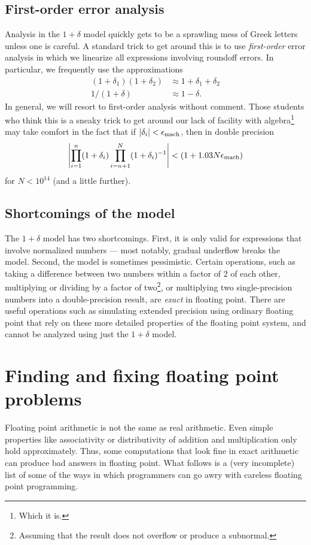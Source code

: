 \documentclass[12pt, leqno]{article} %
\begin{document}
\subsection{First-order error analysis}

Analysis in the $1+\delta$ model quickly gets to be a sprawling mess
of Greek letters unless one is careful.  A standard trick to get
around this is to use {\em first-order} error analysis in which we
linearize all expressions involving roundoff errors.  In particular,
we frequently use the approximations
\begin{align*}
  (1+\delta_1)(1+\delta_2) & \approx 1+\delta_1 + \delta_2 \\
  1/(1+\delta) & \approx 1-\delta.
\end{align*}
In general, we will resort to first-order analysis without comment.
Those students who think this is a sneaky trick to get around our
lack of facility with algebra\footnote{%
Which it is.
}
may take comfort in the fact that if $|\delta_i| < \epsilon_{\mathrm{mach}}$, then
in double precision
\[
  \left| \prod_{i=1}^n (1+\delta_i) \prod_{i=n+1}^N (1+\delta_i)^{-1} \right| < (1+1.03 N \epsilon_{\mathrm{mach}})
\]
for $N < 10^{14}$ (and a little further).

\subsection{Shortcomings of the model}

The $1+\delta$ model has two shortcomings.  First, it is only valid
for expressions that involve normalized numbers --- most notably,
gradual underflow breaks the model.  Second, the model is sometimes
pessimistic.  Certain operations, such as taking a difference between
two numbers within a factor of $2$ of each other, multiplying or
dividing by a factor of two\footnote{Assuming that the result
does not overflow or produce a subnormal.}, or multiplying two
single-precision numbers into a double-precision result,
are {\em exact} in floating point.  There are useful operations
such as simulating extended precision using ordinary floating point
that rely on these more detailed properties of the floating point system,
and cannot be analyzed using just the $1+\delta$ model.

\section{Finding and fixing floating point problems}

Floating point arithmetic is not the same as real arithmetic.  Even
simple properties like associativity or distributivity of addition and
multiplication only hold approximately.  Thus, some computations that
look fine in exact arithmetic can produce bad answers in floating
point.  What follows is a (very incomplete) list of some of the ways
in which programmers can go awry with careless floating point
programming.
\end{document}
